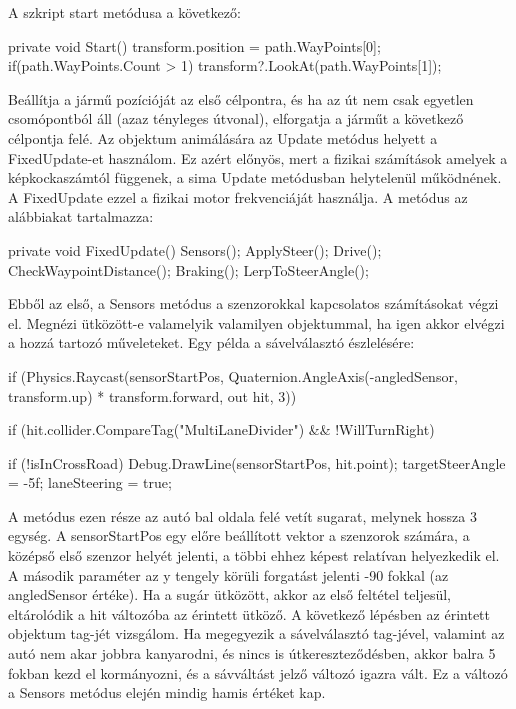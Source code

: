 A szkript start metódusa a következő:
\begin{cpp}
private void Start()
    {
        transform.position = path.WayPoints[0];
        if(path.WayPoints.Count > 1)
        {
            transform?.LookAt(path.WayPoints[1]);
        }
    }
\end{cpp}
Beállítja a jármű pozícióját az első célpontra, és ha az út nem csak egyetlen csomópontból áll (azaz tényleges útvonal), elforgatja a járműt a következő célpontja felé.
Az objektum animálására az Update metódus helyett a FixedUpdate-et használom. Ez azért előnyös, mert a fizikai számítások amelyek a képkockaszámtól függenek, a sima Update metódusban helytelenül működnének. A FixedUpdate ezzel a fizikai motor frekvenciáját használja. A metódus az alábbiakat tartalmazza:
\begin{cpp}
private void FixedUpdate()
    {
        Sensors();
        ApplySteer();
        Drive();
        CheckWaypointDistance();
        Braking();
        LerpToSteerAngle();
    }
\end{cpp}
Ebből az első, a Sensors metódus a szenzorokkal kapcsolatos számításokat végzi el. Megnézi ütközött-e valamelyik valamilyen objektummal, ha igen akkor elvégzi a hozzá tartozó műveleteket. Egy példa a sávelválasztó észlelésére:
\begin{cpp}
if (Physics.Raycast(sensorStartPos, Quaternion.AngleAxis(-angledSensor,
	 transform.up) * transform.forward, out hit, 3))
        {
            if (hit.collider.CompareTag("MultiLaneDivider") && 
            !WillTurnRight)
            {
                if (!isInCrossRoad)
                {
                    Debug.DrawLine(sensorStartPos, hit.point);
                    targetSteerAngle = -5f;
                    laneSteering = true;
                }

            }
        }
\end{cpp}
A metódus ezen része az autó bal oldala felé vetít sugarat, melynek hossza 3 egység. A sensorStartPos egy előre beállított vektor a szenzorok számára, a középső első szenzor helyét jelenti, a többi ehhez képest relatívan helyezkedik el. A második paraméter az y tengely körüli forgatást jelenti -90 fokkal (az angledSensor értéke). Ha a sugár ütközött, akkor az első feltétel teljesül, eltárolódik a hit változóba az érintett ütköző. A következő lépésben az érintett objektum tag-jét vizsgálom. Ha megegyezik a sávelválasztó tag-jével, valamint az autó nem akar jobbra kanyarodni, és nincs is útkereszteződésben, akkor balra 5 fokban kezd el kormányozni, és a sávváltást jelző változó igazra vált. Ez a változó a Sensors metódus elején mindig hamis értéket kap.

